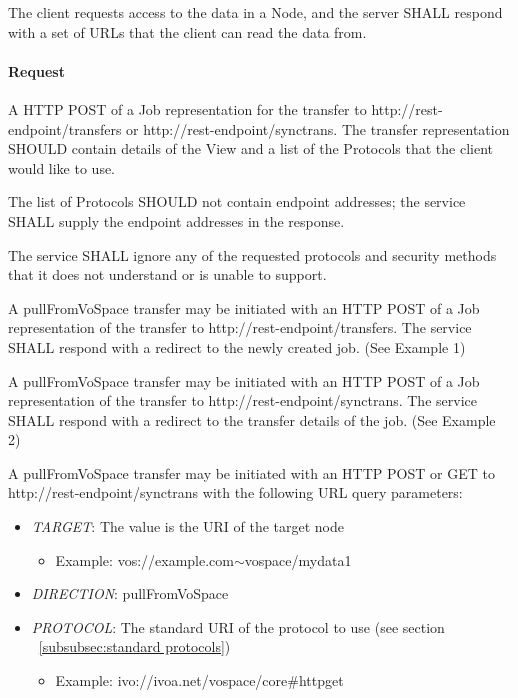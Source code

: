 \documentclass[11pt,a4paper]{ivoa}
\begin{document}
The client requests access to the data in a Node, and the server SHALL respond with a set of URLs that the client can read the data from.

\paragraph{Request}
A HTTP POST of a Job representation for the transfer to http://rest-endpoint/transfers or http://rest-endpoint/synctrans.
The transfer representation SHOULD contain details of the View and a list of the Protocols that the client would like to use.

The list of Protocols SHOULD not contain endpoint addresses; the service SHALL supply the endpoint addresses in the response.

The service SHALL ignore any of the requested protocols and security methods that it does not understand or is unable to support.

A pullFromVoSpace transfer may be initiated with an HTTP POST of a Job representation of the transfer to http://rest-endpoint/transfers. The service SHALL respond with a redirect to the newly created job.  (See Example 1)

A pullFromVoSpace transfer may be initiated with an HTTP POST of a Job representation of the transfer to http://rest-endpoint/synctrans. The service SHALL respond with a redirect to the transfer details of the job.  (See Example 2)

A pullFromVoSpace transfer may be initiated with an HTTP POST or GET to http://rest-endpoint/synctrans with the following URL query parameters:
\begin{itemize}
    \item \emph{TARGET}: The value is the URI of the target node
        \begin{itemize}
           \item Example:  vos://example.com$\mathtt{\sim}$vospace/mydata1
        \end{itemize}
    \item \emph{DIRECTION}: pullFromVoSpace
    \item \emph{PROTOCOL}: The standard URI of the protocol to use (see section ~\ref{subsubsec:standard protocols})
        \begin{itemize}
           \item Example: ivo://ivoa.net/vospace/core\#httpget
        \end{itemize}
\end{itemize}
\end{document}
